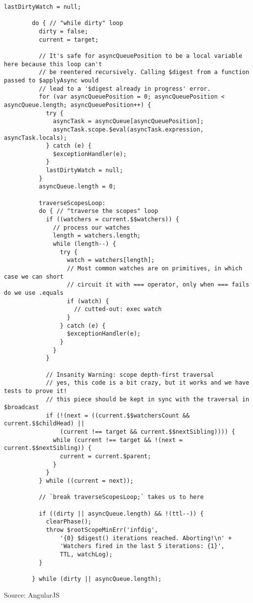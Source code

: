 \documentclass[inzynier,druk,ramka]{build/dyplom}
\begin{document}
\begin{lstlisting}
lastDirtyWatch = null;

        do { // "while dirty" loop
          dirty = false;
          current = target;

          // It's safe for asyncQueuePosition to be a local variable here because this loop can't
          // be reentered recursively. Calling $digest from a function passed to $applyAsync would
          // lead to a '$digest already in progress' error.
          for (var asyncQueuePosition = 0; asyncQueuePosition < asyncQueue.length; asyncQueuePosition++) {
            try {
              asyncTask = asyncQueue[asyncQueuePosition];
              asyncTask.scope.$eval(asyncTask.expression, asyncTask.locals);
            } catch (e) {
              $exceptionHandler(e);
            }
            lastDirtyWatch = null;
          }
          asyncQueue.length = 0;

          traverseScopesLoop:
          do { // "traverse the scopes" loop
            if ((watchers = current.$$watchers)) {
              // process our watches
              length = watchers.length;
              while (length--) {
                try {
                  watch = watchers[length];
                  // Most common watches are on primitives, in which case we can short
                  // circuit it with === operator, only when === fails do we use .equals
                  if (watch) {
                    // cutted-out: exec watch
                  }
                } catch (e) {
                  $exceptionHandler(e);
                }
              }
            }

            // Insanity Warning: scope depth-first traversal
            // yes, this code is a bit crazy, but it works and we have tests to prove it!
            // this piece should be kept in sync with the traversal in $broadcast
            if (!(next = ((current.$$watchersCount && current.$$childHead) ||
                (current !== target && current.$$nextSibling)))) {
              while (current !== target && !(next = current.$$nextSibling)) {
                current = current.$parent;
              }
            }
          } while ((current = next));

          // `break traverseScopesLoop;` takes us to here

          if ((dirty || asyncQueue.length) && !(ttl--)) {
            clearPhase();
            throw $rootScopeMinErr('infdig',
                '{0} $digest() iterations reached. Aborting!\n' +
                'Watchers fired in the last 5 iterations: {1}',
                TTL, watchLog);
          }

        } while (dirty || asyncQueue.length);
\end{lstlisting}
Source: AngularJS \cite{angulardigest}
\end{document}
